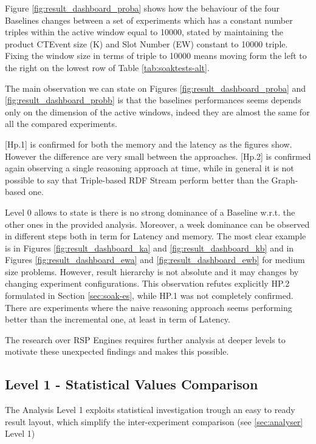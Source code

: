 Figure \ref{fig:result_dashboard_proba}  shows how the behaviour of the four Baselines changes between a set of experiments which has a constant number triples within the active window equal to 10000, stated by maintaining the product CTEvent size (K) and Slot Number (EW) constant to 10000 triple. Fixing the window size in terms of triple to 10000 means moving form the left to the right on the lowest row of Table \ref{tab:soaktests-alt}. 

The main observation we can state on Figures \ref{fig:result_dashboard_proba} and \ref{fig:result_dashboard_probb}  is that the baselines performances seems depends only on the dimension of the active windows, indeed they are almost the same for all the compared experiments.

[Hp.1] is confirmed for both the memory and the latency as the figures show. However the difference are very small between the approaches. [Hp.2] is confirmed again observing a single reasoning approach at time, while in general it is not possible to say that Triple-based RDF Stream perform better than the Graph-based one.

Level 0 allows to state is there is no strong dominance of a Baseline w.r.t. the other ones in the provided analysis. Moreover, a week dominance can be observed in different steps both in term for Latency  and memory. The most clear example is in Figures \ref{fig:result_dashboard_ka} and \ref{fig:result_dashboard_kb} and in Figures \ref{fig:result_dashboard_ewa} and \ref{fig:result_dashboard_ewb} for medium size problems. However, result hierarchy is not absolute and it may changes by changing experiment configurations. This observation refutes explicitly HP.2 formulated in Section \ref{sec:soak-es}, while HP.1 was not completely confirmed. There are experiments where the naive  reasoning  approach seems performing better than the incremental one, at least in term of Latency. 

The research over RSP Engines requires further analysis at deeper levels to  motivate these unexpected findings and \name makes this possible.

\subsection{Level 1 -  Statistical Values Comparison}\label{sec:eval-level1}



The Analysis Level 1 exploits statistical investigation trough an easy to ready result layout, which simplify the inter-experiment comparison (see \ref{sec:analyser} Level 1)

